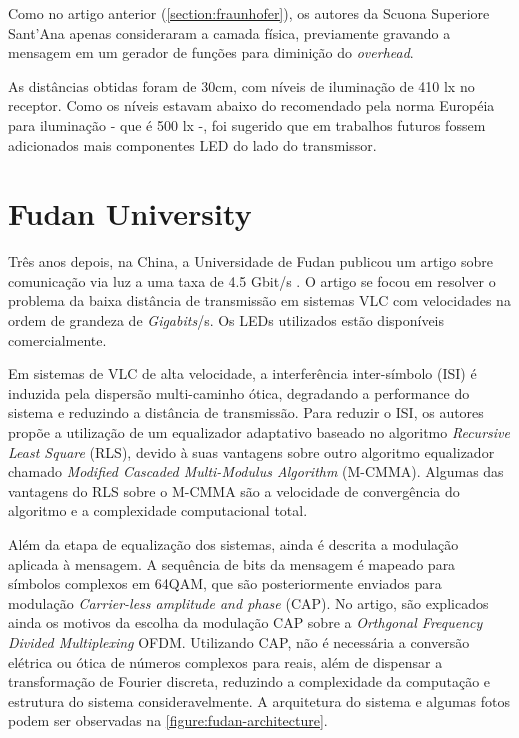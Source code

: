	Como no artigo anterior (\autoref{section:fraunhofer}), os autores da Scuona Superiore Sant’Ana apenas consideraram a camada física, previamente gravando a mensagem em um gerador de funções para diminição do \textit{overhead}. 
	
	As distâncias obtidas foram de 30cm, com níveis de iluminação de 410 lx no receptor. Como os níveis estavam abaixo do recomendado pela norma Européia para iluminação - que é 500 lx -, foi sugerido que em trabalhos futuros fossem adicionados mais componentes LED do lado do transmissor.
	
	\section{Fudan University}
	
	Três anos depois, na China, a Universidade de Fudan publicou um artigo sobre comunicação via luz a uma taxa de 4.5 Gbit/s \cite{4.5g-fudan}. O artigo se focou em resolver o problema da baixa distância de transmissão em sistemas VLC com velocidades na ordem de grandeza de \textit{Gigabits}/s. Os LEDs utilizados estão disponíveis comercialmente.
	
	Em sistemas de VLC de alta velocidade, a interferência inter-símbolo (ISI) é induzida pela dispersão multi-caminho ótica, degradando a performance do sistema e reduzindo a distância de transmissão. Para reduzir o ISI, os autores propõe a utilização de um equalizador adaptativo baseado no algoritmo \textit{Recursive Least Square} (RLS), devido à suas vantagens sobre outro algoritmo equalizador chamado \textit{Modified Cascaded Multi-Modulus Algorithm} (M-CMMA). Algumas das vantagens do RLS sobre o M-CMMA são a velocidade de convergência do algoritmo e a complexidade computacional total.
	
	Além da etapa de equalização dos sistemas, ainda é descrita a modulação aplicada à mensagem. A sequência de bits da mensagem é mapeado para símbolos complexos em 64QAM, que são posteriormente enviados para modulação \textit{Carrier-less amplitude and phase} (CAP). No artigo, são explicados ainda os motivos da escolha da modulação CAP sobre a \textit{Orthgonal Frequency Divided Multiplexing} OFDM. Utilizando CAP, não é necessária a conversão elétrica ou ótica de números complexos para reais, além de dispensar a transformação de Fourier discreta, reduzindo a complexidade da computação e estrutura do sistema consideravelmente. A arquitetura do sistema e algumas fotos podem ser observadas na \autoref{figure:fudan-architecture}.
	

